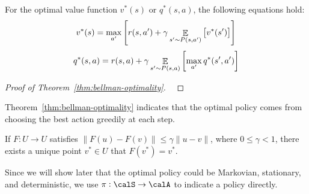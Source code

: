 \begin{theorem}\label{thm:bellman-optimality}
    For the optimal value function $v^*(s)$ or $q^*(s, a)$, the following equations hold: \begin{align}
        v^*(s) = \max_{a'} \left[ r(s, a') + \gamma \mathop{\mathbb{E}}_{s' \sim P(s, a')} \left[ v^*(s')\right]  \right]
    \end{align} \begin{align}
        q^*(s, a) = r(s, a) + \gamma \mathop{\mathbb{E}}_{s' \sim P(s, a)} \left[ \max_{a'}  q^*(s', a')\right] 
    \end{align}
\end{theorem}
\begin{proof}[Proof of Theorem~\ref{thm:bellman-optimality}]~\label{prf:bellman-optimality}
\end{proof}

Theorem~\ref{thm:bellman-optimality} indicates that the optimal policy comes from choosing the best action greedily at each step.


\begin{lemma}
    If $F: U \to U$ satisfies $\|F(u) - F(v)\| \le \gamma \|u-v\|$, where $0\le \gamma < 1$, there exists a unique point $v^* \in U$ that $F(v^*) = v^*$. 
\end{lemma}

\begin{note}
    Since we will show later that the optimal policy could be Markovian, stationary, and deterministic, we use $\pi: \calS \to \calA$ to indicate a policy directly.
\end{note}

